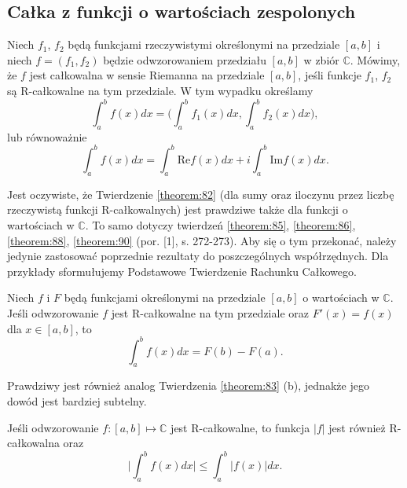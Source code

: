 \documentclass[leqno]{article}
\begin{document}
\begin{justify}
\subsection{Całka z funkcji o wartościach zespolonych}
\begin{defn}
    Niech $f_1$, $f_2$ będą funkcjami rzeczywistymi określonymi na przedziale $[a,b]$ i niech $f = (f_1, f_2)$ będzie odwzorowaniem przedziału $[a,b]$ w zbiór $\mathbb{C}$.
    Mówimy, że $f$ jest całkowalna w sensie Riemanna na przedziale $[a,b]$, jeśli funkcje $f_1$, $f_2$ są R-całkowalne na tym przedziale.
    W tym wypadku określamy
    \[
        \int_{a}^{b}f(x)dx = \Bigg(\int_{a}^{b}f_1(x)dx, \int_{a}^{b}f_2(x)dx\Bigg),
    \]
    lub równoważnie
    \[
        \int_{a}^{b}f(x)dx = \int_{a}^{b}\text{Re} f(x)dx + i \int_{a}^{b} \text{Im} f(x)dx.
    \]
\end{defn}

Jest oczywiste, że Twierdzenie \ref{theorem:82} (dla sumy oraz iloczynu przez liczbę rzeczywistą funkcji R-całkowalnych)
jest prawdziwe także dla funkcji o wartościach w $\mathbb{C}$. To samo dotyczy twierdzeń 
\ref{theorem:85}, \ref{theorem:86}, \ref{theorem:88}, \ref{theorem:90} (por. [1], s. 272-273).
Aby się o tym przekonać, należy jedynie zastosować poprzednie rezultaty do poszczególnych współrzędnych.
Dla przykłady sformułujemy Podstawowe Twierdzenie Rachunku Całkowego.

\begin{theorem}
{
    Niech $f$ i $F$ będą funkcjami określonymi na przedziale $[a,b]$ o wartościach w $\mathbb{C}$. Jeśli odwzorowanie $f$ jest R-całkowalne na tym przedziale
    oraz $F'(x) = f(x)$ dla $x \in [a,b]$, to
    \[
        \int_{a}^{b}f(x)dx = F(b) - F(a).
    \]
}
\end{theorem}

Prawdziwy jest również analog Twierdzenia \ref{theorem:83} (b), jednakże jego dowód jest bardziej subtelny.

\begin{theorem}
{
    Jeśli odwzorowanie $f : [a,b] \mapsto \mathbb{C}$ jest R-całkowalne, to funkcja $|f|$ jest również R-całkowalna oraz
    \[
        \Big| \int_{a}^{b}f(x)dx \Big| \leqslant \int_{a}^{b} |f(x)|dx.
    \]
}
\end{theorem}


\end{justify}
\end{document}
